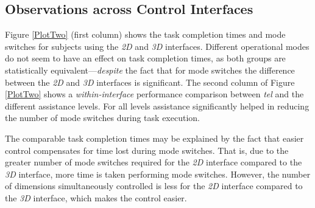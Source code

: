\documentclass[letterpaper, 10 pt, journal, twoside]{IEEEtran}  %
\begin{document}
	\subsection{Observations across Control Interfaces}
	Figure \ref{PlotTwo} (first column) shows the task completion times and mode switches for subjects using the \textit{2D} and \textit{3D} interfaces. Different operational modes do not seem to have an effect on task completion times, as both groups are statistically equivalent---\textit{despite} the fact that for mode switches the difference between the \textit{2D} and \textit{3D} interfaces is significant. The second column of Figure \ref{PlotTwo} shows a \textit{within-interface} performance comparison between \textit{tel} and the different assistance levels. For all levels assistance significantly helped in reducing the number of mode switches during task execution.
	
	The comparable task completion times may be explained by the fact that easier control compensates for time lost during mode switches. That is, due to the greater number of mode switches required for the \textit{2D} interface compared to the \textit{3D} interface, more time is taken performing mode switches. However, the number of dimensions simultaneously controlled is less for the \textit{2D} interface compared to the \textit{3D} interface, which makes the control easier.
	
\end{document}
